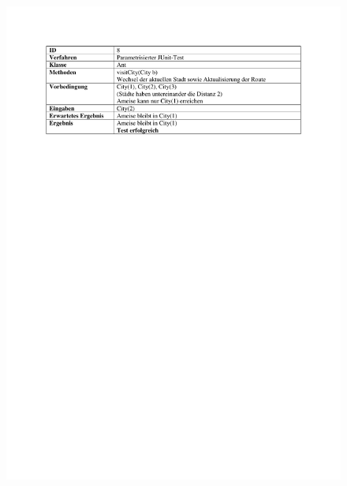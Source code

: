 \begin{appendices}
\begin{figure}[h]
		\includegraphics[width=\linewidth]{images/Testfaelle_Ant_Seite_3.pdf}
		\label{testAnt3}
	\end{figure}


\end{appendices}
